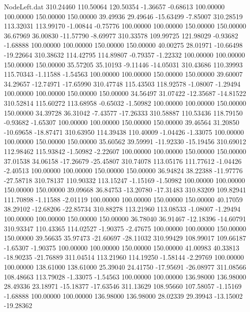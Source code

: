 \begin{filecontents}{NodeLeft.dat}
 310.24460  110.50064  120.50354    -1.36657   -0.68613  100.00000  100.00000  150.00000  150.00000   39.49936   29.49646  -15.63499   -7.85007
 310.28519  113.32031  113.99170    -1.00844   -0.75776  100.00000  100.00000  150.00000  150.00000   36.67969   36.00830  -11.57790   -8.69977
 310.33578  109.99725  121.98029    -0.93682   -1.68888  100.00000  100.00000  150.00000  150.00000   40.00275   28.01971  -10.66498  -19.22664
 310.38632  114.42795  114.89807    -0.79357   -1.22332  100.00000  100.00000  150.00000  150.00000   35.57205   35.10193   -9.11446  -14.05031
 310.43686  110.39993  115.70343    -1.11588   -1.54563  100.00000  100.00000  150.00000  150.00000   39.60007   34.29657  -12.74971  -17.65990
 310.47748  115.43503  118.92578    -1.08007   -1.29494  100.00000  100.00000  150.00000  150.00000   34.56497   31.07422  -12.35687  -14.81522
 310.52814  115.60272  113.68958    -0.65032   -1.50982  100.00000  100.00000  150.00000  150.00000   34.39728   36.31042   -7.43577  -17.26333
 310.58887  110.53436  118.79150    -0.93682   -1.65307  100.00000  100.00000  150.00000  150.00000   39.46564   31.20850  -10.69658  -18.87471
 310.63950  114.39438  110.40009    -1.04426   -1.33075  100.00000  100.00000  150.00000  150.00000   35.60562   39.59991  -11.92330  -15.19456
 310.69012  112.98462  115.93842    -1.50982   -2.22607  100.00000  100.00000  150.00000  150.00000   37.01538   34.06158  -17.26679  -25.45807
 310.74078  113.05176  111.77612    -1.04426   -2.40513  100.00000  100.00000  150.00000  150.00000   36.94824   38.22388  -11.97776  -27.58718
 310.78137  110.90332  113.15247    -1.15169   -1.50982  100.00000  100.00000  150.00000  150.00000   39.09668   36.84753  -13.20780  -17.31483
 310.83209  109.82941  111.70898    -1.11588   -2.01119  100.00000  100.00000  150.00000  150.00000   40.17059   38.29102  -12.68206  -22.85734
 310.88278  113.21960  113.08533    -1.08007   -1.29494  100.00000  100.00000  150.00000  150.00000   36.78040   36.91467  -12.18396  -14.60791
 310.93347  110.43365  114.02527    -1.90375   -2.47675  100.00000  100.00000  150.00000  150.00000   39.56635   35.97473  -21.60697  -28.11032
 310.99429  108.99017  109.66187    -1.65307   -1.90375  100.00000  100.00000  150.00000  150.00000   41.00983   40.33813  -18.90235  -21.76889
 311.04514  113.21960  114.19250    -1.58144   -2.29769  100.00000  100.00000  138.61000  138.61000   25.39040   24.41750  -17.95691  -26.08977
 311.08566  108.48663  113.79028    -1.33075   -1.54563  100.00000  100.00000  136.98000  136.98000   28.49336   23.18971  -15.18377  -17.63546
 311.13629  108.95660  107.58057    -1.15169   -1.68888  100.00000  100.00000  136.98000  136.98000   28.02339   29.39943  -13.15002  -19.28362

\end{filecontents}
